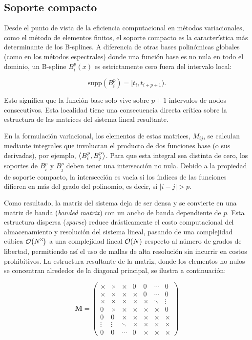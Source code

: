 \documentclass[12pt, a4paper, oneside, spanish]{book}
\begin{document}
\subsection{Soporte compacto}

Desde el punto de vista de la eficiencia computacional en métodos variacionales, como el método de elementos finitos, el soporte compacto es la característica más determinante de los B-splines. A diferencia de otras bases polinómicas globales (como en los métodos espectrales) donde una función base es no nula en todo el dominio, un B-spline \( B_i^p(x) \) es estrictamente cero fuera del intervalo local:

\[ \text{supp}(B_i^p) = [t_i, t_{i+p+1}). \]

Esto significa que la función base solo vive sobre \( p+1 \) intervalos de nodos consecutivos. Esta localidad tiene una consecuencia directa crítica sobre la estructura de las matrices del sistema lineal resultante.

En la formulación variacional, los elementos de estas matrices, \( M_{ij} \), se calculan mediante integrales que involucran el producto de dos funciones base (o sus derivadas), por ejemplo, \( \ev{B_i^p,B_j^p} \). Para que esta integral sea distinta de cero, los soportes de \( B_i^p \) y \( B_j^p \) deben tener una intersección no nula. Debido a la propiedad de soporte compacto, la intersección es vacía si los índices de las funciones difieren en más del grado del polinomio, es decir, si \( |i-j| > p \).

Como resultado, la matriz del sistema deja de ser densa y se convierte en una matriz de banda (\textit{banded matrix}) con un ancho de banda dependiente de \( p \). Esta estructura dispersa (\textit{sparse}) reduce drásticamente el costo computacional del almacenamiento y resolución del sistema lineal, pasando de una complejidad cúbica \( \order{N^3} \) a una complejidad lineal \( \order{N} \) respecto al número de grados de libertad, permitiendo así el uso de mallas de alta resolución sin incurrir en costos prohibitivos. La estructura resultante de la matriz, donde los elementos no nulos se concentran alrededor de la diagonal principal, se ilustra a continuación:

\begin{equation}
\label{eq:banded-matrix}
\mathbf{M} = 
\begin{pmatrix}
\times & \times & \times & 0 & 0 & \cdots & 0 \\
\times & \times & \times & \times & 0 & \cdots & 0 \\
\times & \times & \times & \times & \times & \ddots & \vdots \\
0 & \times & \times & \times & \times & \times & 0 \\
0 & 0 & \times & \times & \times & \times & \times \\
\vdots & \vdots & \ddots & \times & \times & \times & \times \\
0 & 0 & \cdots & 0 & \times & \times & \times
\end{pmatrix}
\end{equation}
\end{document}
